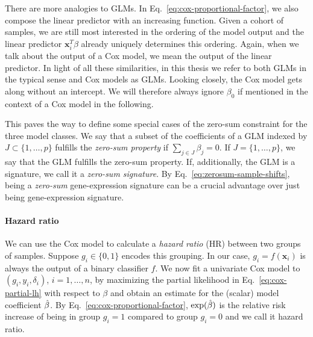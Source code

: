 There are more analogies to GLMs. In Eq.\ \eqref{eq:cox-proportional-factor}, we also compose the 
linear predictor with an increasing function. Given a cohort of samples, we are still most 
interested in the ordering of the model output and the linear predictor $\mathbf{x}_i^T \beta$ 
already uniquely determines this ordering. Again, when we talk about the output of a Cox model, we 
mean the output of the linear predictor. In light of all these similarities,
in this thesis we refer to both GLMs in the typical sense and Cox models as GLMs. Looking closely,
the Cox model gets along without an intercept. We will therefore always ignore $\beta_0$ if 
mentioned in the context of a Cox model in the following.

This paves the way to define some special cases of the zero-sum constraint for the three model 
classes. We say that a subset of the coefficients of a GLM indexed by $J \subset \{1, \ldots, p \}$ 
fulfills the \textit{zero-sum property} if $\sum_{j \in J} \beta_j = 0$. If $J = \{1, \ldots, p \}$, 
we say that the GLM fulfills the zero-sum property. If, additionally, the GLM is a signature, we 
call it a \textit{zero-sum signature}. By Eq.\ \ref{eq:zerosum-sample-shifts}, being a 
\textit{zero-sum} gene-expression signature can be a crucial advantage over just being 
gene-expression signature.

\paragraph{Hazard ratio}

We can use the Cox model to calculate a \textit{hazard ratio} (HR) between two groups of samples. 
Suppose $g_i \in \{0, 1\}$ encodes this grouping. In our case, $g_i = f(\mathbf{x}_i)$ is always 
the output of a binary classifier $f$. We now fit a univariate Cox model to $(g_i, y_i, \delta_i)$, 
$i = 1, \ldots, n$, by maximizing 
the partial likelihood in Eq.\ \eqref{eq:cox-partial-lh} with respect to $\beta$ and obtain an estimate
for the (scalar) model coefficient $\hat{\beta}$. By Eq.\ \eqref{eq:cox-proportional-factor}, 
$\exp(\hat{\beta})$ is the relative risk increase of being in group $g_i = 1$ compared to group 
$g_i = 0$ and we call it hazard ratio.

